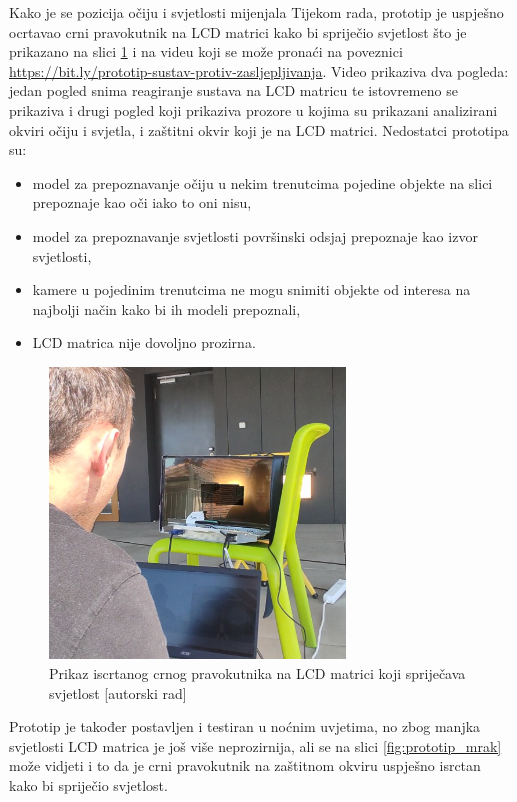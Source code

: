 \documentclass{foi}
\begin{document}
Kako je se pozicija očiju i svjetlosti mijenjala Tijekom rada, prototip je uspješno ocrtavao crni pravokutnik na LCD matrici kako bi spriječio svjetlost što je prikazano na slici \ref{fig:prototip_zastita} i na videu koji se može pronaći na poveznici \url{https://bit.ly/prototip-sustav-protiv-zasljepljivanja}. Video prikaziva dva pogleda: jedan pogled snima reagiranje sustava na LCD matricu te istovremeno se prikaziva i drugi pogled koji prikaziva prozore u kojima su prikazani analizirani okviri očiju i svjetla, i zaštitni okvir koji je na LCD matrici. Nedostatci prototipa su:
\begin{itemize}[noitemsep]
    \item model za prepoznavanje očiju u nekim trenutcima pojedine objekte na slici prepoznaje kao oči iako to oni nisu,
    \item model za prepoznavanje svjetlosti površinski odsjaj prepoznaje kao izvor svjetlosti,
    \item kamere u pojedinim trenutcima ne mogu snimiti objekte od interesa na najbolji način kako bi ih modeli prepoznali,
    \item LCD matrica nije dovoljno prozirna.
\end{itemize}

\begin{figure}[h!]
    \centering
    \includegraphics[width=0.7\textwidth]{slike/prototip_zastita}
    \caption{Prikaz iscrtanog crnog pravokutnika na LCD matrici koji spriječava svjetlost [autorski rad]}
    \label{fig:prototip_zastita}
\end{figure}

\newpage
Prototip je također postavljen i testiran u noćnim uvjetima, no zbog manjka svjetlosti LCD matrica je još više neprozirnija, ali se na slici \ref{fig:prototip_mrak} može vidjeti i to da je crni pravokutnik na zaštitnom okviru uspješno isrctan kako bi spriječio svjetlost.
\end{document}

